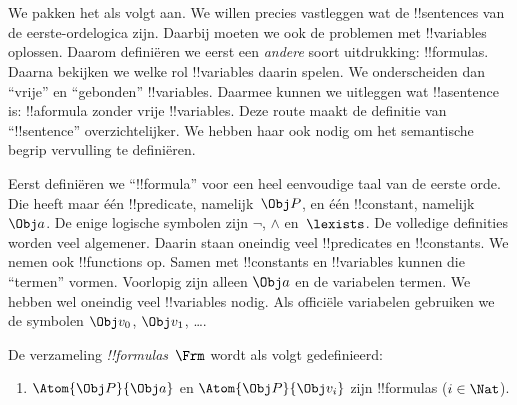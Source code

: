 \documentclass[../../../include/open-logic-section]{subfiles}
\begin{document}

\section{}

We pakken het als volgt aan. We willen precies vastleggen wat de
!!{sentence}s van de eerste-ordelogica zijn. Daarbij moeten we ook de
problemen met !!{variable}s oplossen. Daarom definiëren we eerst een
\emph{andere} soort uitdrukking: !!{formula}s. Daarna bekijken we welke
rol !!{variable}s daarin spelen. We onderscheiden dan ``vrije'' en
``gebonden'' !!{variable}s. Daarmee kunnen we uitleggen wat
!!a{sentence} is: !!a{formula} zonder vrije !!{variable}s. Deze route
maakt de definitie van ``!!{sentence}'' overzichtelijker. We hebben
haar ook nodig om het semantische begrip vervulling te definiëren.

Eerst definiëren we ``!!{formula}'' voor een heel eenvoudige taal van
de eerste orde. Die heeft maar één !!{predicate}, namelijk~$\Obj P$,
en één !!{constant}, namelijk~$\Obj a$. De enige logische symbolen zijn
$\lnot$, $\land$ en~$\lexists$. De volledige definities worden veel
algemener. Daarin staan oneindig veel !!{predicate}s en
!!{constant}s. We nemen ook !!{function}s op. Samen met !!{constant}s
en !!{variable}s kunnen die ``termen'' vormen. Voorlopig zijn alleen
$\Obj a$ en de variabelen termen. We hebben wel oneindig veel
!!{variable}s nodig. Als officiële variabelen gebruiken we de symbolen
$\Obj v_0$, $\Obj v_1$, \dots.

\begin{defn}
De verzameling \emph{!!{formula}s}~$\Frm$ wordt als volgt gedefinieerd:
\begin{enumerate}
\item{} $\Atom{\Obj P}{\Obj a}$ en $\Atom{\Obj
  P}{\Obj v_i}$ zijn !!{formula}s ($i \in \Nat$).




\end{enumerate}
\end{defn}
\end{document}
